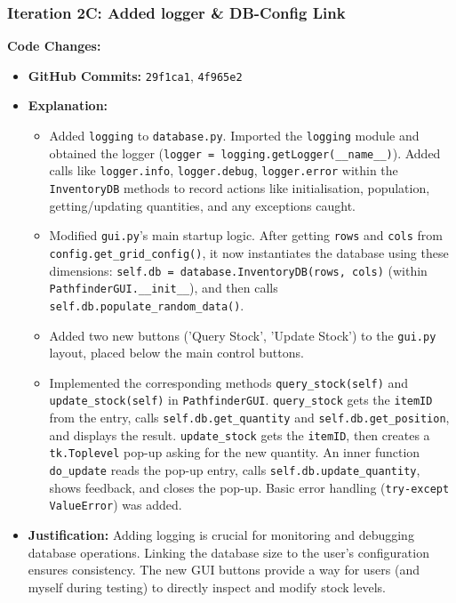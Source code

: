 \newpage

\subsubsection{Iteration 2C: Added logger \& DB-Config Link}

\textbf{Code Changes:}
\begin{itemize}
	\item \textbf{GitHub Commits:} \verb|29f1ca1|, \verb|4f965e2|
	\item \textbf{Explanation:}
	\begin{itemize}
		\item Added \verb|logging| to \verb|database.py|. Imported the \verb|logging| module and obtained the logger (\verb|logger = logging.getLogger(__name__)|). Added calls like \verb|logger.info|, \verb|logger.debug|, \verb|logger.error| within the \verb|InventoryDB| methods to record actions like initialisation, population, getting/updating quantities, and any exceptions caught.
		\item Modified \verb|gui.py|'s main startup logic. After getting \verb|rows| and \verb|cols| from \verb|config.get_grid_config()|, it now instantiates the database using these dimensions: \verb|self.db = database.InventoryDB(rows, cols)| (within \verb|PathfinderGUI.__init__|), and then calls \verb|self.db.populate_random_data()|.
		\item Added two new buttons ('Query Stock', 'Update Stock') to the \verb|gui.py| layout, placed below the main control buttons.
		\item Implemented the corresponding methods \verb|query_stock(self)| and \verb|update_stock(self)| in \verb|PathfinderGUI|. \verb|query_stock| gets the \verb|itemID| from the entry, calls \verb|self.db.get_quantity| and \verb|self.db.get_position|, and displays the result. \verb|update_stock| gets the \verb|itemID|, then creates a \verb|tk.Toplevel| pop-up asking for the new quantity. An inner function \verb|do_update| reads the pop-up entry, calls \verb|self.db.update_quantity|, shows feedback, and closes the pop-up. Basic error handling (\verb|try-except ValueError|) was added.
	\end{itemize}
	\item \textbf{Justification:} Adding logging is crucial for monitoring and debugging database operations. Linking the database size to the user's configuration ensures consistency. The new GUI buttons provide a way for users (and myself during testing) to directly inspect and modify stock levels.
\end{itemize}

